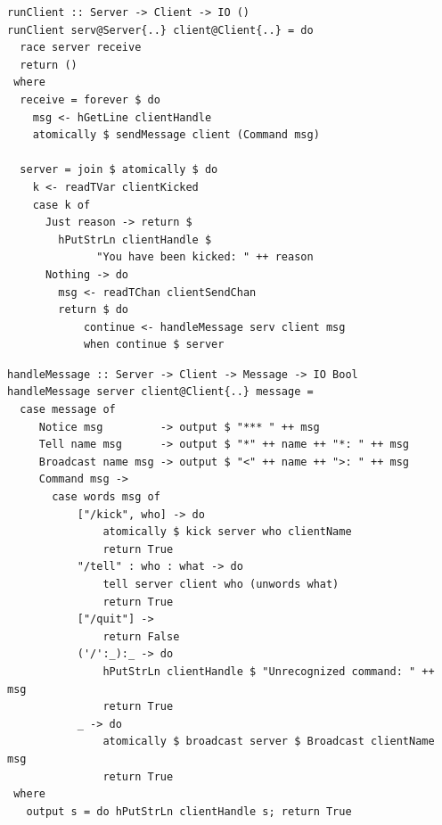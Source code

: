 \documentclass{beamer}
\begin{document}

\begin{frame}[fragile]

\begin{verbatim}
runClient :: Server -> Client -> IO ()
runClient serv@Server{..} client@Client{..} = do
  race server receive
  return ()
 where
  receive = forever $ do
    msg <- hGetLine clientHandle
    atomically $ sendMessage client (Command msg)

  server = join $ atomically $ do
    k <- readTVar clientKicked
    case k of
      Just reason -> return $
        hPutStrLn clientHandle $
              "You have been kicked: " ++ reason
      Nothing -> do
        msg <- readTChan clientSendChan
        return $ do
            continue <- handleMessage serv client msg
            when continue $ server
\end{verbatim}

\end{frame}


\begin{frame}[fragile]

\begin{verbatim}
handleMessage :: Server -> Client -> Message -> IO Bool
handleMessage server client@Client{..} message =
  case message of
     Notice msg         -> output $ "*** " ++ msg
     Tell name msg      -> output $ "*" ++ name ++ "*: " ++ msg
     Broadcast name msg -> output $ "<" ++ name ++ ">: " ++ msg
     Command msg ->
       case words msg of
           ["/kick", who] -> do
               atomically $ kick server who clientName
               return True
           "/tell" : who : what -> do
               tell server client who (unwords what)
               return True
           ["/quit"] ->
               return False
           ('/':_):_ -> do
               hPutStrLn clientHandle $ "Unrecognized command: " ++ msg
               return True
           _ -> do
               atomically $ broadcast server $ Broadcast clientName msg
               return True
 where
   output s = do hPutStrLn clientHandle s; return True
\end{verbatim}

\end{frame}
\end{document}
